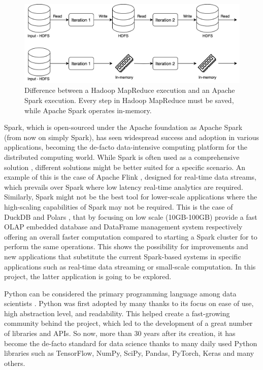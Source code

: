 \begin{figure}[!ht]
    \begin{center}
      \includegraphics[width=\textwidth]{figures/1-introduction/Spark_MapReduce.png}
    \end{center}
    \caption{Difference between a Hadoop MapReduce execution and an Apache Spark execution. Every step in Hadoop MapReduce must be saved, while Apache Spark operates in-memory.}
    \label{fig:MapReducevsSpark}
\end{figure}


Spark, which is open-sourced under the Apache foundation as Apache Spark \cite{ApacheSparkUnified} (from now on simply Spark), has seen widespread success and adoption in various applications, becoming the de-facto data-intensive computing platform for the distributed computing world. While Spark is often used as a comprehensive solution \cite{zahariaApacheSparkUnified2016}, different solutions might be better suited for a specific scenario. An example of this is the case of Apache Flink \cite{carboneApacheFlinkStream}, designed for real-time data streams, which prevails over Spark where low latency real-time analytics are required. Similarly, Spark might not be the best tool for lower-scale applications where the high-scaling capabilities of Spark may not be required. This is the case of DuckDB \cite{raasveldtDuckDBEmbeddableAnalytical2019} and Polars \cite{vinkWroteOneFastest2021}, that by focusing on low scale (10GB-100GB) provide a fast \gls{OLAP} embedded database and DataFrame management system respectively offering an overall faster computation compared to starting a Spark cluster for to perform the same operations. This shows the possibility for improvements and new applications that substitute the current Spark-based systems in specific applications such as real-time data streaming or small-scale computation. In this project, the latter application is going to be explored.

Python can be considered the primary programming language among data scientists \cite{Python_CS-R9526}. Python was first adopted by many thanks to its focus on ease of use, high abstraction level, and readability. This helped create a fast-growing community behind the project, which led to the development of a great number of libraries and \glspl{API}. So now, more than 30 years after its creation, it has become the de-facto standard for data science thanks to many daily used Python libraries such as TensorFlow, NumPy, SciPy, Pandas, PyTorch, Keras and many others.

